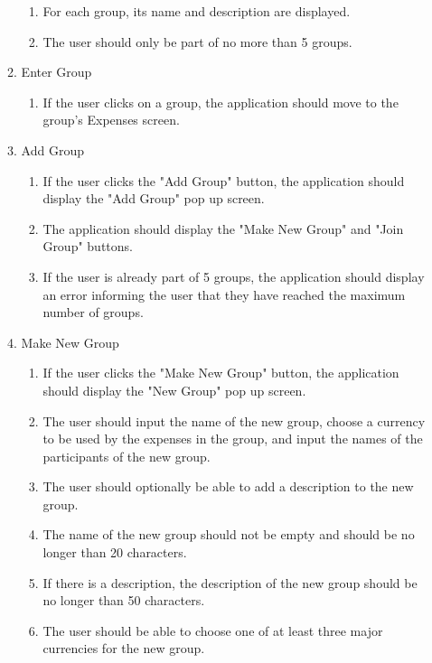 \documentclass[conference]{IEEEtran}
\begin{document}
\begin{enumerate}
\begin{enumerate}
\begin{enumerate}
                        \item For each group, its name and description are displayed.
                        \item The user should only be part of no more than 5 groups.
                    \end{enumerate}
                \item Enter Group
                    \begin{enumerate}
                        \item If the user clicks on a group, the application should move to the group's Expenses screen.
                    \end{enumerate}
                \item Add Group
                    \begin{enumerate}
                        \item If the user clicks the "Add Group" button, the application should display the "Add Group" pop up screen.
                        \item The application should display the "Make New Group" and "Join Group" buttons.
                        \item If the user is already part of 5 groups, the application should display an error informing the user that they have reached the maximum number of groups.
                    \end{enumerate}
                \item Make New Group
                    \begin{enumerate}
                        \item If the user clicks the "Make New Group" button, the application should display the "New Group" pop up screen.
                        \item The user should input the name of the new group, choose a currency to be used by the expenses in the group, and input the names of the participants of the new group.
                        \item The user should optionally be able to add a description to the new group.
                        \item The name of the new group should not be empty and should be no longer than 20 characters.
                        \item If there is a description, the description of the new group should be no longer than 50 characters.
                        \item The user should be able to choose one of at least three major currencies for the new group.

\end{enumerate}
\end{enumerate}
\end{enumerate}
\end{document}

